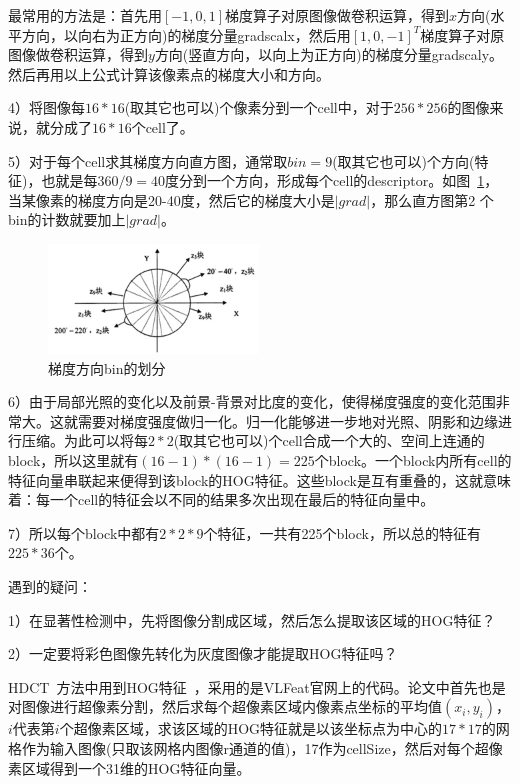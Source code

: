 \documentclass[12pt]{article}
\begin{document}
最常用的方法是：首先用$[-1, 0, 1]$梯度算子对原图像做卷积运算，得到$x$方向(水平方向，以向右为正方向)的梯度分量gradscalx，然后用$[1, 0, -1]^T$梯度算子对原图像做卷积运算，得到$y$方向(竖直方向，以向上为正方向)的梯度分量gradscaly。然后再用以上公式计算该像素点的梯度大小和方向。

4）将图像每$16*16$(取其它也可以)个像素分到一个cell中，对于$256*256$的图像来说，就分成了$16*16$个cell了。

5）对于每个cell求其梯度方向直方图，通常取$bin = 9$(取其它也可以)个方向(特征)，也就是每$360/9 = 40$度分到一个方向，形成每个cell的descriptor。如图~\ref{fig: 方向梯度}，当某像素的梯度方向是20-40度，然后它的梯度大小是$|grad|$，那么直方图第2
个bin的计数就要加上$|grad|$。

\begin{figure}[!ht]
\centering
\includegraphics[width=0.5\textwidth]{方向梯度.png}
\caption{梯度方向bin的划分}
\label{fig: 方向梯度}
\end{figure} 

6）由于局部光照的变化以及前景-背景对比度的变化，使得梯度强度的变化范围非常大。这就需要对梯度强度做归一化。归一化能够进一步地对光照、阴影和边缘进行压缩。为此可以将每$2*2$(取其它也可以)个cell合成一个大的、空间上连通的block，所以这里就有$(16-1)*(16-1) = 225$个block。一个block内所有cell的特征向量串联起来便得到该block的HOG特征。这些block是互有重叠的，这就意味着：每一个cell的特征会以不同的结果多次出现在最后的特征向量中。

7）所以每个block中都有$2*2*9$个特征，一共有225个block，所以总的特征有$225*36$个。

遇到的疑问：

1）在显著性检测中，先将图像分割成区域，然后怎么提取该区域的HOG特征？

2）一定要将彩色图像先转化为灰度图像才能提取HOG特征吗？

HDCT~\cite{kim2014salient}方法中用到HOG特征~\cite{felzenszwalb2010object}，采用的是VLFeat官网上的代码。论文中首先也是对图像进行超像素分割，然后求每个超像素区域内像素点坐标的平均值$(x_i, y_i)$，$i$代表第$i$个超像素区域，求该区域的HOG特征就是以该坐标点为中心的$17*17$的网格作为输入图像(只取该网格内图像r通道的值)，17作为cellSize，然后对每个超像素区域得到一个31维的HOG特征向量。
\end{document}
